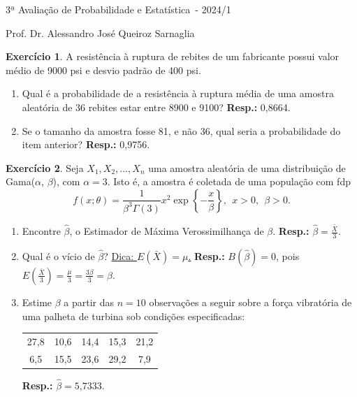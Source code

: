 \documentclass[]{article}
\newcommand{\avaliacao}{3}
\newcommand{\disciplina}{Probabilidade e Estatística}
\newcommand{\semestre}{2024/1}
\theoremstyle{definition}
\newtheorem{ex}{Exercício}
\begin{document}
\thispagestyle{empty}
\begin{center}
\Large{\avaliacao ª Avaliação de \disciplina\ - \semestre}

\large{Prof. Dr. Alessandro José Queiroz Sarnaglia}
\end{center}

\begin{ex}
A resistência à ruptura de rebites de um fabricante possui valor médio de 9000 psi e desvio padrão de 400 psi.
\begin{enumerate}
	\item Qual é a probabilidade de a resistência à ruptura média de uma amostra aleatória de 36 rebites estar entre 8900 e 9100? \textbf{Resp.:} 0,8664.
	\item Se o tamanho da amostra fosse 81, e não 36, qual seria a probabilidade do item anterior? \textbf{Resp.:} 0,9756.
\end{enumerate}
\end{ex}


\begin{ex}
Seja $X_1, X_2, \ldots, X_n$ uma amostra aleatória de uma distribuição de Gama($\alpha$, $\beta$), com $\alpha=3$. Isto é, a amostra é coletada de uma população com fdp
$$
f(x;\theta) = \frac{1}{\beta^3\Gamma(3)}x^{2}\exp\left\{-\frac{x}{\beta}\right\}, \ \ x > 0, \ \ \beta>0.
$$
\begin{enumerate}
	\item Encontre $\hat\beta$, o Estimador de Máxima Verossimilhança de $\beta$. \textbf{Resp.:} $\hat\beta = \frac{\bar{X}}{3}$.
	\item Qual é o vício de $\hat\beta$? \underline{Dica: $E(\bar{X}) = \mu$.} \textbf{Resp.:} $B(\hat\beta) = 0$, pois $E(\frac{\bar{X}}{3}) = \frac{\mu}{3} = \frac{3\beta}{3} = \beta$.
	\item Estime $\beta$ a partir das $n = 10$ observações a seguir sobre a força vibratória de uma palheta de turbina sob condições especificadas:
	\begin{center}
	\begin{tabular}{ccccc}
		27,8 & 10,6 & 14,4 & 15,3 & 21,2 \\
		6,5 & 15,5 & 23,6 & 29,2 & 7,9\\
	\end{tabular}
	\end{center}
	\textbf{Resp.:} $\hat\beta = 5\text{,}7333$.
\end{enumerate}
\end{ex}
\end{document}
